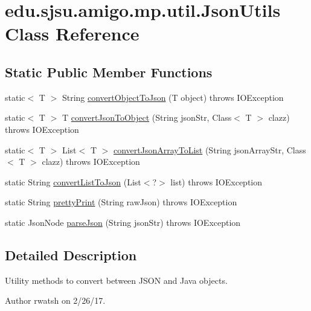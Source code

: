 \hypertarget{classedu_1_1sjsu_1_1amigo_1_1mp_1_1util_1_1_json_utils}{}\section{edu.\+sjsu.\+amigo.\+mp.\+util.\+Json\+Utils Class Reference}
\label{classedu_1_1sjsu_1_1amigo_1_1mp_1_1util_1_1_json_utils}
\subsection*{Static Public Member Functions}
\begin{DoxyCompactItemize}
\item 
static$<$ T $>$ String \hyperlink{classedu_1_1sjsu_1_1amigo_1_1mp_1_1util_1_1_json_utils_af0ed0c8802d135ecd34c28c721555520}{convert\+Object\+To\+Json} (T object)  throws I\+O\+Exception 
\item 
static$<$ T $>$ T \hyperlink{classedu_1_1sjsu_1_1amigo_1_1mp_1_1util_1_1_json_utils_a5c05bfeb59e28dd21858215642d7ddff}{convert\+Json\+To\+Object} (String json\+Str, Class$<$ T $>$ clazz)  throws I\+O\+Exception 
\item 
static$<$ T $>$ List$<$ T $>$ \hyperlink{classedu_1_1sjsu_1_1amigo_1_1mp_1_1util_1_1_json_utils_adeb0a62c6af63396bbe07e2335f67d29}{convert\+Json\+Array\+To\+List} (String json\+Array\+Str, Class$<$ T $>$ clazz)  throws I\+O\+Exception 
\item 
static String \hyperlink{classedu_1_1sjsu_1_1amigo_1_1mp_1_1util_1_1_json_utils_a65242756248bee95337b2b6b759dafb2}{convert\+List\+To\+Json} (List$<$?$>$ list)  throws I\+O\+Exception 
\item 
static String \hyperlink{classedu_1_1sjsu_1_1amigo_1_1mp_1_1util_1_1_json_utils_a75f99520f5cde57bd3e44c372fc41f85}{pretty\+Print} (String raw\+Json)  throws I\+O\+Exception 
\item 
static Json\+Node \hyperlink{classedu_1_1sjsu_1_1amigo_1_1mp_1_1util_1_1_json_utils_ad8033daeed68ff47f3c6aa0603dad6e2}{parse\+Json} (String json\+Str)  throws I\+O\+Exception 
\end{DoxyCompactItemize}


\subsection{Detailed Description}
Utility methods to convert between J\+S\+ON and Java objects.

\begin{DoxyAuthor}{Author}
rwatsh on 2/26/17. 
\end{DoxyAuthor}


